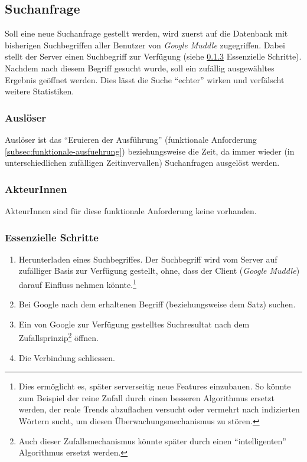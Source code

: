 \subsection{Suchanfrage}
\label{subsec:funktionale-suche}

Soll eine neue Suchanfrage gestellt werden, wird zuerst auf die Datenbank mit
bisherigen Suchbegriffen aller Benutzer von \textit{Google Muddle} zugegriffen.
Dabei stellt der Server einen Suchbegriff zur Verfügung (siehe 
\ref{subsubsec:funktionale-suche-schritte} Essenzielle Schritte). Nachdem nach
diesem Begriff gesucht wurde, soll ein zufällig ausgewähltes Ergebnis geöffnet
werden. Dies lässt die Suche \enquote{echter} wirken und verfälscht weitere
Statistiken.

\subsubsection{Auslöser}

Auslöser ist das \enquote{Eruieren der Ausführung} (funktionale Anforderung
\ref{subsec:funktionale-ausfuehrung}) beziehungsweise die Zeit, da immer wieder
(in unterschiedlichen zufälligen Zeitinvervallen) Suchanfragen ausgelöst werden.

\subsubsection{AkteurInnen}

AkteurInnen sind für diese funktionale Anforderung keine vorhanden.

\subsubsection{Essenzielle Schritte}
\label{subsubsec:funktionale-suche-schritte}

\begin{enumerate}
\item Herunterladen eines Suchbegriffes. Der Suchbegriff wird vom Server auf
zufälliger Basis zur Verfügung gestellt, ohne, dass der Client (\textit{Google
Muddle}) darauf Einfluss nehmen könnte.\footnote[1]{Dies ermöglicht es, später
serverseitig neue Features einzubauen. So könnte zum Beispiel der reine Zufall
durch einen besseren Algorithmus ersetzt werden, der reale Trends abzuflachen
versucht oder vermehrt nach indizierten Wörtern sucht, um diesen
Überwachungsmechanismus zu stören.}
\item Bei Google nach dem erhaltenen Begriff (beziehungsweise dem Satz) suchen.
\item Ein von Google zur Verfügung gestelltes Suchresultat nach dem
Zufallsprinzip\footnote[2]{Auch dieser Zufallsmechanismus könnte später durch
einen \enquote{intelligenten} Algorithmus ersetzt werden.} öffnen.
\item Die Verbindung schliessen.
\end{enumerate}
